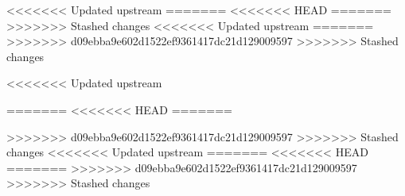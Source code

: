 \begin{symbols}
%
<<<<<<< Updated upstream
=======
<<<<<<< HEAD
=======
>>>>>>> Stashed changes
<<<<<<< Updated upstream
=======
>>>>>>> d09ebba9e602d1522ef9361417dc21d129009597
>>>>>>> Stashed changes

<<<<<<< Updated upstream

=======
<<<<<<< HEAD
=======

>>>>>>> d09ebba9e602d1522ef9361417dc21d129009597
>>>>>>> Stashed changes
\sym{}{}
<<<<<<< Updated upstream
=======
<<<<<<< HEAD
=======
>>>>>>> d09ebba9e602d1522ef9361417dc21d129009597
>>>>>>> Stashed changes


\end{symbols}
